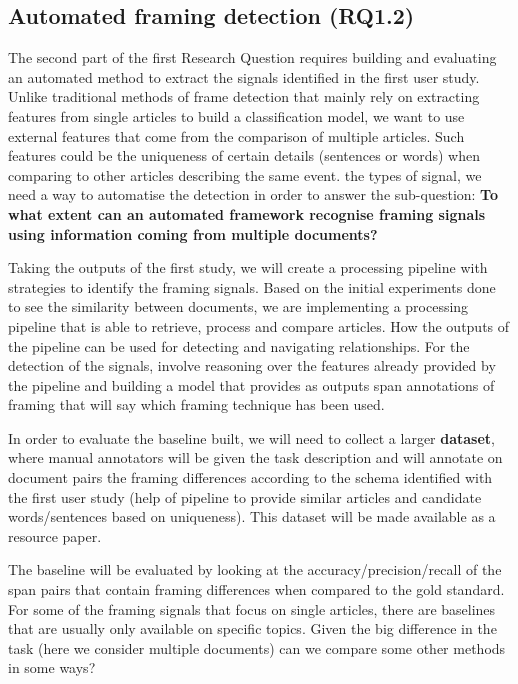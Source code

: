 \subsection{Automated framing detection (RQ1.2)}

The second part of the first Research Question requires building and evaluating an automated method to extract the signals identified in the first user study.
Unlike traditional methods of frame detection that mainly rely on extracting features from single articles to build a classification model, we want to use external features that come from the comparison of multiple articles. Such features could be the uniqueness of certain details (sentences or words) when comparing to other articles describing the same event.
the types of signal, we need a way to automatise the detection in order to answer the sub-question:
\textbf{To what extent can an automated framework recognise framing signals using information coming from multiple documents?}

Taking the outputs of the first study, we will create a processing pipeline with strategies to identify the framing signals.
Based on the initial experiments done to see the similarity between documents, we are implementing a processing pipeline that is able to retrieve, process and compare articles.
How the outputs of the pipeline can be used for detecting and navigating relationships.
For the detection of the signals, involve reasoning over the features already provided by the pipeline and building a model that provides as outputs span annotations of framing that will say which framing technique has been used.

In order to evaluate the baseline built, we will need to collect a larger \textbf{dataset}, where manual annotators will be given the task description and will annotate on document pairs the framing differences according to the schema identified with the first user study (help of pipeline to provide similar articles and candidate words/sentences based on uniqueness).
This dataset will be made available as a resource paper.

The baseline will be evaluated by looking at the accuracy/precision/recall of the span pairs that contain framing differences when compared to the gold standard.
For some of the framing signals that focus on single articles, there are baselines that are usually only available on specific topics.
Given the big difference in the task (here we consider multiple documents) can we compare some other methods in some ways?

